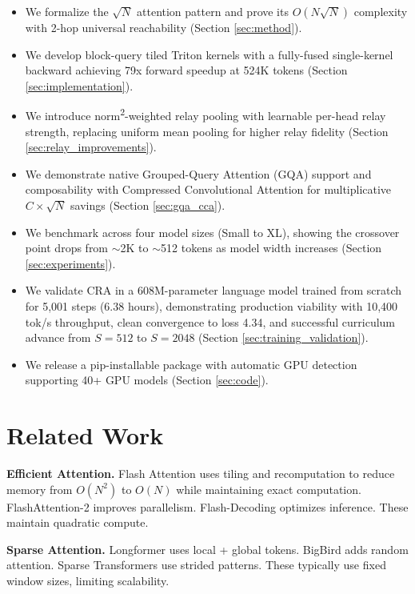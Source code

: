 \documentclass{article}
\begin{document}
    \begin{itemize}
        \item We formalize the $\sqrt{N}$ attention pattern and prove its $O(N\sqrt{N})$ complexity with 2-hop universal reachability (Section \ref{sec:method}).
        \item We develop block-query tiled Triton kernels with a fully-fused single-kernel backward achieving 79x forward speedup at 524K tokens (Section \ref{sec:implementation}).
        \item We introduce norm\textsuperscript{2}-weighted relay pooling with learnable per-head relay strength, replacing uniform mean pooling for higher relay fidelity (Section \ref{sec:relay_improvements}).
        \item We demonstrate native Grouped-Query Attention (GQA) support and composability with Compressed Convolutional Attention for multiplicative $C \times \sqrt{N}$ savings (Section \ref{sec:gqa_cca}).
        \item We benchmark across four model sizes (Small to XL), showing the crossover point drops from $\sim$2K to $\sim$512 tokens as model width increases (Section \ref{sec:experiments}).
        \item We validate CRA in a 608M-parameter language model trained from scratch for 5,001 steps (6.38 hours), demonstrating production viability with 10,400 tok/s throughput, clean convergence to loss 4.34, and successful curriculum advance from $S{=}512$ to $S{=}2048$ (Section \ref{sec:training_validation}).
        \item We release a pip-installable package with automatic GPU detection supporting 40+ GPU models (Section \ref{sec:code}).
    \end{itemize}

    \section{Related Work}

    \textbf{Efficient Attention.} Flash Attention \cite{flashattn} uses tiling and recomputation to reduce memory from $O(N^2)$ to $O(N)$ while maintaining exact computation. FlashAttention-2 \cite{flashattn2} improves parallelism. Flash-Decoding \cite{flashdecoding} optimizes inference. These maintain quadratic compute.

    \textbf{Sparse Attention.} Longformer \cite{longformer} uses local + global tokens. BigBird \cite{bigbird} adds random attention. Sparse Transformers \cite{sparse_transformers} use strided patterns. These typically use fixed window sizes, limiting scalability.
\end{document}
